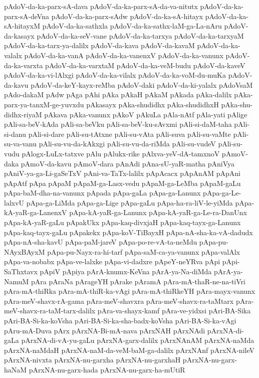 {pAdoV-da-ka-parx-sA-dava
pAdoV-da-ka-parx-sA-da-va-nitutx
pAdoV-da-ka-parx-sA-deVna
pAdoV-da-ka-parx-sAdw
pAdoV-da-ka-sA-hitayx
pAdoV-da-ka-sA-hitayxM
pAdoV-da-ka-sathxla
pAdoV-da-ka-sathx-laM-ga-La-nAru
pAdoV-da-kasayx
pAdoV-da-ka-seV-vane
pAdoV-da-ka-tarxya
pAdoV-da-ka-tarxyaM
pAdoV-da-ka-tarx-ya-dalilx
pAdoV-da-kava
pAdoV-da-kavaM
pAdoV-da-ka-valalx
pAdoV-da-ka-vanA
pAdoV-da-ka-vanenxV
pAdoV-da-ka-vanunx
pAdoV-da-ka-varxta
pAdoV-da-ka-varxtaM
pAdoV-da-ka-veM-budu
pAdoV-da-kaveV
pAdoV-da-ka-vi-lAlxgi
pAdoV-da-ka-vilalx
pAdoV-da-ka-voM-du-muKa
pAdoV-da-kavu
pAdoV-da-keY-kayx-reMba
pAdoV-daki
pAdoV-da-ki-yalalx
pAdoVsaM
pAdo-dakaM
pAdw
pAga
pAhi
pAka
pAkaH
pAkaM
pAkada
pAka-dalilx
pAka-parx-ya-tanxM-ge-yuvxdu
pAkasayx
pAka-shudidhx
pAka-shudidhxH
pAka-shu-didhx-riyaM
pAkava
pAka-vanunx
pAkoV
pAkuLa
pAla-nAtf
pAla-yati
pAlige
pAli-sa-beV-kAda
pAli-sa-beVku
pAli-sa-beV-ku-sAvxmi
pAli-si-daM-taha
pAli-si-danu
pAli-si-dare
pAli-su-tAtxne
pAli-su-vAta
pAli-suva
pAli-su-vaMte
pAli-su-va-vanu
pAli-su-vu-da-kAkxgi
pAli-su-vu-da-riMda
pAli-su-vudeV
pAli-su-vudu
pAlogx-LuLx-tatxve
pAlu
pAlukx-rike
pAlxva-yeV-dA-tamxnoV
pAmoV-daka
pAmoV-da-kavu
pAmoV-dara
pAnAdi
pAna-sU-yaR-matha
pAniVya
pAniV-ya-ga-Li-gaSeTxV
pAni-va-TaTx-lalilx
pApAcacx
pApAnAM
pApAni
pApAtf
pApa
pApaM
pApaM-ga-Lasx-vedu
pApaM-ga-LeMba
pApaM-gaLu
pApa-baM-dha-na-vanunx
pApada
pApa-gaLa
pApa-ga-Lanunx
pApa-ga-Le-lalxvU
pApa-ga-LiMda
pApa-ga-Lige
pApa-gaLu
pApa-ha-ra-liV-le-yiMda
pApa-kA-yaR-ga-LanenxV
pApa-kA-yaR-ga-Lanunx
pApa-kA-yaR-ga-Le-ra-DanUnx
pApa-kA-yaR-gaLu
pApakUkx
pApa-kaq-divxjaH
pApa-kaq-tayx-ga-Lanunx
pApa-kaq-tayx-gaLu
pApakekx
pApa-koV-TiBayxH
pApa-nA-sha-ka-vA-dadudx
pApa-nA-sha-kavU
pApa-paM-jareV
pApa-po-re-vA-ta-neMdu
pApa-pu-NAyxBAyxM
pApa-pu-Nayx-ra-hi-tarf
pApa-saM-ca-ya-vanunx
pApa-valAlx
pApa-va-nobabx
pApa-ve-lalxke
pApa-vi-dadxre
pApeY-neYRva
pApi
pApi-SaThxtavx
pApiV
pApiya
pArA-knumx-KeVna
pArA-ya-Na-diMda
pArA-ya-NamuM
pAra
pAraNa
pArageYH
pArake
pAramA
pAra-mA-thaR-ne-na-tiVri
pAra-mA-thiRka
pAra-mA-thiR-ka-vAgi
pAra-mA-thiRkeYH
pAra-mayx-vanunx
pAra-meV-shavx-rA-gama
pAra-meV-shavxra
pAra-meV-shavx-ra-taMtarx
pAra-meV-shavx-ra-taM-tarx-dalilx
pAra-va-shayx-kamf
pAra-ve-yidxsi
pAri-BA-Sika
pAri-BA-Si-ka-koVsha
pAri-BA-Si-ka-sha-badx-koVsha
pAri-BA-Si-ka-vAgi
pAru-mA-Duva
pArx
pArxNA-Bi-mA-nava
pArxNAH
pArxNAdi
pArxNA-di-gaLa
pArxNA-di-vA-yu-gaLu
pArxNA-garx-dalilx
pArxNAnAM
pArxNA-naMda
pArxNA-naMdaH
pArxNA-naM-da-veM-baM-ga-dalilx
pArxNAnf
pArxNA-nileV
pArxNA-nivxta
pArxNA-nu-garxha
pArxNA-nu-garxhaH
pArxNA-nu-garx-haNaM
pArxNA-nu-garx-hada
pArxNA-nu-garx-ha-mUtiR
}
